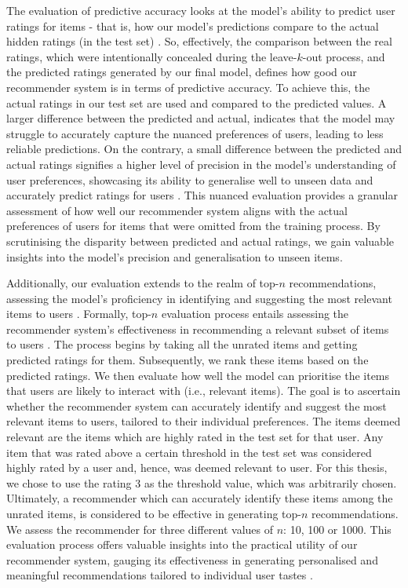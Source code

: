 The evaluation of predictive accuracy looks at the model's ability to predict user ratings for items - that is, how our model’s predictions compare to the actual hidden ratings (in the test set) \cite{madadipouya2017literature}. So, effectively, the comparison between the real ratings, which were intentionally concealed during the leave-$k$-out process, and the predicted ratings generated by our final model, defines how good our recommender system is in terms of predictive accuracy. To achieve this, the actual ratings in our test set are used and compared to the predicted values. A larger difference between the predicted and actual, indicates that the model may struggle to accurately capture the nuanced preferences of users, leading to less reliable predictions. On the contrary, a small difference between the predicted and actual ratings signifies a higher level of precision in the model's understanding of user preferences, showcasing its ability to generalise well to unseen data and accurately predict ratings for users \cite{steck2013evaluation}. This nuanced evaluation provides a granular assessment of how well our recommender system aligns with the actual preferences of users for items that were omitted from the training process. By scrutinising the disparity between predicted and actual ratings, we gain valuable insights into the model's precision and generalisation to unseen items.

Additionally, our evaluation extends to the realm of top-$n$ recommendations, assessing the model's proficiency in identifying and suggesting the most relevant items to users \cite{steck2013evaluation}. Formally, top-$n$ evaluation process entails assessing the recommender system's effectiveness in recommending a relevant subset of items to users \cite{steck2013evaluation}. The process begins by taking all the unrated items and getting predicted ratings for them. Subsequently, we rank these items based on the predicted ratings. We then evaluate how well the model can prioritise the items that users are likely to interact with (i.e., relevant items). The goal is to ascertain whether the recommender system can accurately identify and suggest the most relevant items to users, tailored to their individual preferences. The items deemed relevant are the items which are highly rated in the test set for that user. Any item that was rated above a certain threshold in the test set was considered highly rated by a user and, hence, was deemed relevant to user. For this thesis, we chose to use the rating 3 as the threshold value, which was arbitrarily chosen. Ultimately, a recommender which can accurately identify these items among the unrated items, is considered to be effective in generating top-$n$ recommendations. We assess the recommender for three different values of $n$: 10, 100 or 1000. This evaluation process offers valuable insights into the practical utility of our recommender system, gauging its effectiveness in generating personalised and meaningful recommendations tailored to individual user tastes \cite{steck2013evaluation}.


